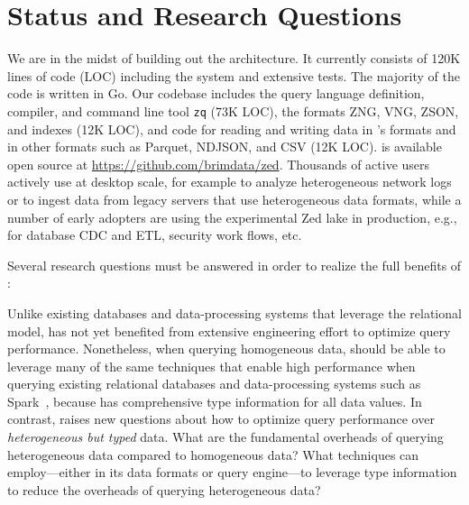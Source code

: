 \section{Status and Research Questions} \label{s:questions}

We are in the midst of building out the \sys{} architecture. It currently consists of 120K lines of code (LOC) including the \sys{} system and extensive tests. The majority of the code is written in Go. Our codebase includes the query language definition, compiler, and command line tool \texttt{zq} (73K LOC), the formats ZNG, VNG, ZSON, and indexes (12K LOC), and code for reading and writing data in \sys{}'s formats and in other formats such as Parquet, NDJSON, and CSV (12K LOC). \sys{} is available open source at \url{https://github.com/brimdata/zed}. Thousands of active users actively use \sys{} at desktop scale, for example to analyze heterogeneous network logs or to ingest data from legacy servers that use heterogeneous data formats, while a number of early adopters are using the experimental Zed lake in production, e.g., for database CDC and ETL, security work flows, etc.


Several research questions must be answered in order to realize the full benefits of \sys{}:

 Unlike existing databases and data-processing systems that leverage the relational model, \sys{} has not yet benefited from extensive engineering effort to optimize query performance. Nonetheless, when querying homogeneous data, \sys{} should be able to leverage many of the same techniques that enable high performance when querying existing relational databases and data-processing systems such as Spark~\cite{spark}, because \sys{} has comprehensive type information for all data values. In contrast, \sys{} raises new questions about how to optimize query performance over {\em heterogeneous but typed} data. What are the fundamental overheads of querying heterogeneous data compared to homogeneous data? What techniques can \sys{} employ---either in its data formats or query engine---to leverage type information to reduce the overheads of querying heterogeneous data?

